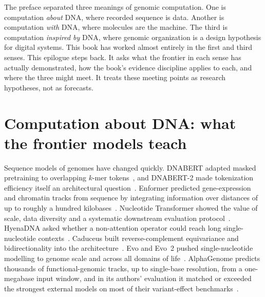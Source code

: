 \label{book:epilogue}\setcounter{figure}{0}\renewcommand{\thefigure}{E.\arabic{figure}}

The preface separated three meanings of genomic computation. One is computation
\emph{about} DNA, where recorded sequence is data. Another is computation \emph{with}
DNA, where molecules are the machine. The third is computation \emph{inspired by} DNA,
where genomic organization is a design hypothesis for digital systems. This book has
worked almost entirely in the first and third senses. This epilogue steps back. It asks
what the frontier in each sense has actually demonstrated, how the book's evidence
discipline applies to each, and where the three might meet. It treats these meeting
points as research hypotheses, not as forecasts.


\section*{Computation about DNA: what the frontier models teach}
Sequence models of genomes have changed quickly. DNABERT adapted masked pretraining to
overlapping $k$-mer tokens~\cite{dnabert2021}, and DNABERT-2 made tokenization efficiency
itself an architectural question~\cite{dnabert2}. Enformer predicted gene-expression
and chromatin tracks from sequence by integrating information over distances of up to
roughly a hundred kilobases~\cite{enformer2021}. Nucleotide Transformer showed the value
of scale, data diversity and a systematic downstream evaluation
protocol~\cite{nt2025}. HyenaDNA asked whether a non-attention operator could reach
long single-nucleotide contexts~\cite{hyenadna}. Caduceus built reverse-complement
equivariance and bidirectionality into the architecture~\cite{caduceus}. Evo and
Evo~2 pushed single-nucleotide modelling to genome scale and across all domains of
life~\cite{evo2024,evo2}. AlphaGenome predicts thousands of functional-genomic tracks,
up to single-base resolution, from a one-megabase input window, and in its authors'
evaluation it matched or exceeded the strongest external models on most of their
variant-effect benchmarks~\cite{alphagenome2026}.

